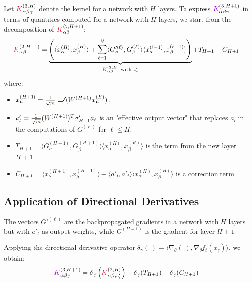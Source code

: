 \documentclass[a4paper]{article}
\newcommand{\W}{\textcolor{weightcolor}{W}}
\newcommand{\m}{\textcolor{weightcolor}{m}}
\DeclareRobustCommand{\ReLU}{\mathrel{\text{%
    \begin{tikzpicture}[baseline=(current bounding box.south)]
        \draw[thick] (0,0) -- (0.25,0) -- (0.4,0.25);
    \end{tikzpicture}}}\!\!}
\theoremstyle{plain}
\theoremstyle{definition}
\theoremstyle{remark}
\begin{document}
Let $\textcolor{kernelcolor}{K}^{(3, H)}_{\alpha\beta\gamma}$ denote the kernel for a network with $H$ layers. To express $\textcolor{k3color}{K}^{(3, H+1)}_{\alpha\beta\gamma}$ in terms of quantities computed for a network with $H$ layers, we start from the decomposition of $\textcolor{kernelcolor}{K}^{(2, H+1)}_{\alpha\beta}$:
\begin{equation}
\textcolor{kernelcolor}{K}^{(2, H+1)}_{\alpha\beta} = \underbrace{\left( \langle x^{(H)}_\alpha, x^{(H)}_\beta \rangle + \sum_{\ell=1}^{H} \langle G'^{(\ell)}_\alpha, G'^{(\ell)}_\beta \rangle \langle x^{(\ell-1)}_\alpha, x^{(\ell-1)}_\beta \rangle \right)}_{\textcolor{kernelcolor}{K}^{(2,H)}_{\alpha\beta} \text{ with } a'_t} + T_{H+1} + C_{H+1}
\end{equation}
where:
\begin{itemize}
    \item $x^{(H+1)}_\mu = \frac{1}{\sqrt{\m}} \ReLU(\W^{(H+1)} x^{(H)}_\mu)$.
    \item $a'_t = \frac{1}{\sqrt{\m}} (\W^{(H+1)})^T \sigma'_{H+1} a_t$ is an "effective output vector" that replaces $a_t$ in the computations of $G^{(\ell)}$ for $\ell \le H$.
    \item $T_{H+1} = \langle G^{(H+1)}_\alpha, G^{(H+1)}_\beta \rangle \langle x^{(H)}_\alpha, x^{(H)}_\beta \rangle$ is the term from the new layer $H+1$.
    \item $C_{H+1} = \langle x^{(H+1)}_\alpha, x^{(H+1)}_\beta \rangle - \langle a'_t, a'_t \rangle \langle x^{(H)}_\alpha, x^{(H)}_\beta \rangle$ is a correction term.
\end{itemize}

\subsection{Application of Directional Derivatives}

The vectors $G'^{(\ell)}$ are the backpropagated gradients in a network with $H$ layers but with $a'_t$ as output weights, while $G^{(H+1)}$ is the gradient for layer $H+1$.

Applying the directional derivative operator $\delta_\gamma(\cdot) = \langle \nabla_\theta (\cdot), \nabla_\theta f_t(x_\gamma) \rangle$, we obtain:
\begin{equation}
\textcolor{k3color}{K}^{(3, H+1)}_{\alpha\beta\gamma} = \delta_\gamma \left(\textcolor{kernelcolor}{K}^{(2,H)}_{\alpha\beta, a'_t} \right) + \delta_\gamma(T_{H+1}) + \delta_\gamma(C_{H+1})
\end{equation}
\end{document}

